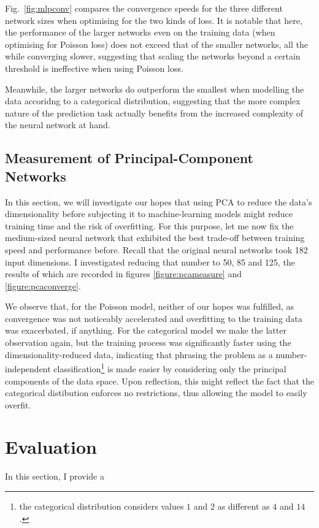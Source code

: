 \documentclass[10pt, twoside, a4paper]{article}
\begin{document}
	Fig.\ \ref{fig:mlpconv} compares the convergence speeds for the three different network 
	sizes when optimising for the two kinds of loss. It is notable that here, the performance 
	of the larger networks even on the training data (when optimising for Poisson loss) does 
	not exceed that of the smaller networks, all the while converging slower, suggesting that 
	scaling the networks beyond a certain threshold is ineffective when using Poisson loss.

	Meanwhile, the larger networks do outperform the smallest when modelling the data 
	accoridng to a categorical distribution, suggesting that the more complex nature of the 
	prediction task actually benefits from the increased complexity of the neural network at 
	hand.

	\subsection{Measurement of Principal-Component Networks}
	In this section, we will investigate our hopes that using PCA to reduce the data's 
	dimensionality before subjecting it to machine-learning models might reduce training time 
	and the risk of overfitting. For this purpose, let me now fix the medium-sized neural 
	network that exhibited the best trade-off between training speed and performance before.
	Recall that the original neural networks took 182 input dimensions. I investigated 
	reducing that number to 50, 85 and 125, the results of which are recorded in figures 
	\ref{figure:pcameasure} and \ref{figure:pcaconverge}.

	We observe that, for the Poisson model, neither of our hopes was fulfilled, as convergence was not noticeably 
	accelerated and overfitting to the training data was exacerbated, if anything. For the 
	categorical model we make the latter observation again, but the training process was 
	significantly faster using the dimensionality-reduced data, indicating that phrasing the 
	problem as a number-independent classification\footnote{the categorical distribution 
	considers values $1$ and $2$ as different as $4$ and $14$.} is made easier by considering 
	only the principal components of the data space. Upon reflection, this might reflect the 
	fact that the categorical distibution enforces no restrictions, thus allowing the model to easily overfit.

	\section{Evaluation}
	In this section, I provide a 
\end{document}
